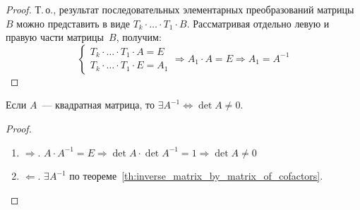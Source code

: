 \begin{proof}
Т.\,о., результат последовательных элементарных преобразований матрицы~$B$ можно представить в виде $T_k \cdot \ldots \cdot T_1 \cdot B$.
Рассматривая отдельно левую и правую части матрицы~$B$, получим:
\begin{equation*}
\begin{cases}
T_k \cdot \ldots \cdot T_1 \cdot A = E \\
T_k \cdot \ldots \cdot T_1 \cdot E = A_1
\end{cases}
\Rightarrow A_1 \cdot A = E \Rightarrow A_1 = A^{-1}
\end{equation*}
\end{proof}

\begin{theorem}
Если $A$~--- квадратная матрица, то $\exists A^{-1} \Leftrightarrow \det A \neq 0$.
\end{theorem}
\begin{proof}
\begin{enumerate}
	\item $\Rightarrow$. $A \cdot A^{-1} = E \Rightarrow
	\det A \cdot \det A^{-1} = 1 \Rightarrow
	\det A \neq 0$
	
	\item $\Leftarrow$. $\exists A^{-1}$ по теореме~\ref*{th:inverse_matrix_by_matrix_of_cofactors}.
\end{enumerate}
\end{proof}